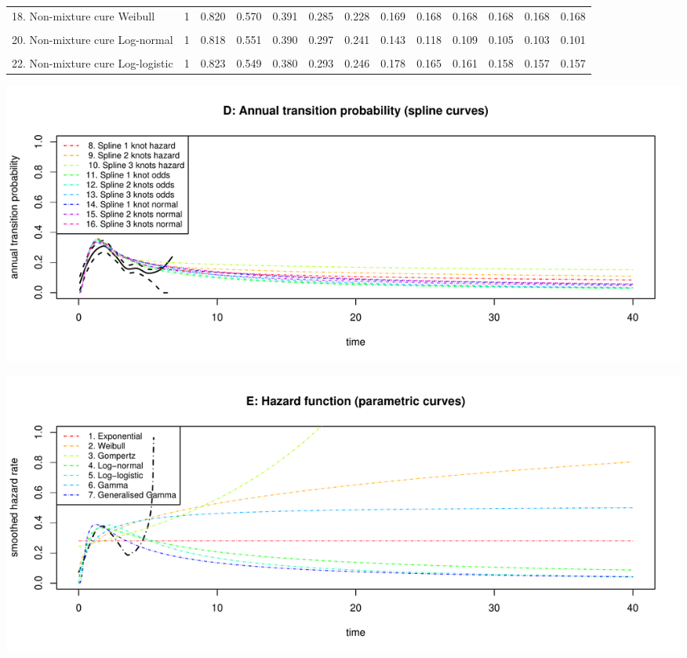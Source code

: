 \documentclass[
]{article}
\begin{document}
\begin{table}
{\begin{tabular}[t]{lrrrrrrrrrrrr}
18. Non-mixture cure Weibull & 1 & 0.820 & 0.570 & 0.391 & 0.285 & 0.228 & 0.169 & 0.168 & 0.168 & 0.168 & 0.168 & 0.168\\
\cellcolor{gray!6}{19. Mixture cure Log-normal} & \cellcolor{gray!6}{1} & \cellcolor{gray!6}{0.818} & \cellcolor{gray!6}{0.558} & \cellcolor{gray!6}{0.394} & \cellcolor{gray!6}{0.295} & \cellcolor{gray!6}{0.235} & \cellcolor{gray!6}{0.134} & \cellcolor{gray!6}{0.116} & \cellcolor{gray!6}{0.111} & \cellcolor{gray!6}{0.109} & \cellcolor{gray!6}{0.108} & \cellcolor{gray!6}{0.108}\\
20. Non-mixture cure Log-normal & 1 & 0.818 & 0.551 & 0.390 & 0.297 & 0.241 & 0.143 & 0.118 & 0.109 & 0.105 & 0.103 & 0.101\\
\cellcolor{gray!6}{21. Mixture cure Log-logistic} & \cellcolor{gray!6}{1} & \cellcolor{gray!6}{0.822} & \cellcolor{gray!6}{0.549} & \cellcolor{gray!6}{0.381} & \cellcolor{gray!6}{0.290} & \cellcolor{gray!6}{0.240} & \cellcolor{gray!6}{0.163} & \cellcolor{gray!6}{0.148} & \cellcolor{gray!6}{0.143} & \cellcolor{gray!6}{0.140} & \cellcolor{gray!6}{0.139} & \cellcolor{gray!6}{0.138}\\
22. Non-mixture cure Log-logistic & 1 & 0.823 & 0.549 & 0.380 & 0.293 & 0.246 & 0.178 & 0.165 & 0.161 & 0.158 & 0.157 & 0.157\\
\bottomrule
\end{tabular}}
\end{table}

\begin{flushleft}\includegraphics[height=0.29\textheight]{Images/validate_extrapolation3-4} \end{flushleft}

\begin{flushleft}\includegraphics[height=0.29\textheight]{Images/validate_extrapolation3-5} \end{flushleft}
\end{document}
